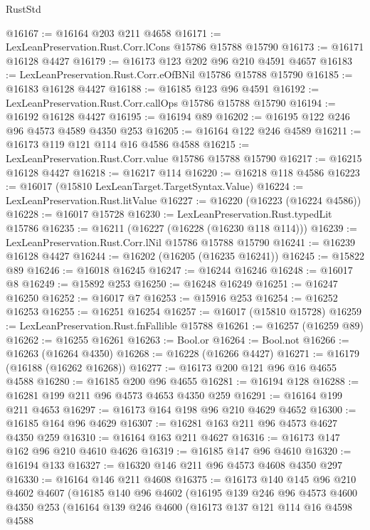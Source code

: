 \begin{lexlean}{RustStd}
\begin{coremodule}
@16167 := @16164 @203 @211 @4658
@16171 := LexLeanPreservation.Rust.Corr.lCons @15786 @15788 @15790
@16173 := @16171 @16128 @4427
@16179 := @16173 @123 @202 @96 @210 @4591 @4657
@16183 := LexLeanPreservation.Rust.Corr.eOfBNil @15786 @15788 @15790
@16185 := @16183 @16128 @4427
@16188 := @16185 @123 @96 @4591
@16192 := LexLeanPreservation.Rust.Corr.callOps @15786 @15788 @15790
@16194 := @16192 @16128 @4427
@16195 := @16194 @89
@16202 := @16195 @122 @246 @96 @4573 @4589 @4350 @253
@16205 := @16164 @122 @246 @4589
@16211 := @16173 @119 @121 @114 @16 @4586 @4588
@16215 := LexLeanPreservation.Rust.Corr.value @15786 @15788 @15790
@16217 := @16215 @16128 @4427
@16218 := @16217 @114
@16220 := @16218 @118 @4586
@16223 := @16017 (@15810 LexLeanTarget.TargetSyntax.Value)
@16224 := LexLeanPreservation.Rust.litValue
@16227 := @16220 (@16223 (@16224 @4586))
@16228 := @16017 @15728
@16230 := LexLeanPreservation.Rust.typedLit @15786
@16235 := @16211 (@16227 (@16228 (@16230 @118 @114)))
@16239 := LexLeanPreservation.Rust.Corr.lNil @15786 @15788 @15790
@16241 := @16239 @16128 @4427
@16244 := @16202 (@16205 (@16235 @16241))
@16245 := @15822 @89
@16246 := @16018 @16245
@16247 := @16244 @16246
@16248 := @16017 @8
@16249 := @15892 @253
@16250 := @16248 @16249
@16251 := @16247 @16250
@16252 := @16017 @7
@16253 := @15916 @253
@16254 := @16252 @16253
@16255 := @16251 @16254
@16257 := @16017 (@15810 @15728)
@16259 := LexLeanPreservation.Rust.fnFallible @15788
@16261 := @16257 (@16259 @89)
@16262 := @16255 @16261
@16263 := Bool.or
@16264 := Bool.not
@16266 := @16263 (@16264 @4350)
@16268 := @16228 (@16266 @4427)
@16271 := @16179 (@16188 (@16262 @16268))
@16277 := @16173 @200 @121 @96 @16 @4655 @4588
@16280 := @16185 @200 @96 @4655
@16281 := @16194 @128
@16288 := @16281 @199 @211 @96 @4573 @4653 @4350 @259
@16291 := @16164 @199 @211 @4653
@16297 := @16173 @164 @198 @96 @210 @4629 @4652
@16300 := @16185 @164 @96 @4629
@16307 := @16281 @163 @211 @96 @4573 @4627 @4350 @259
@16310 := @16164 @163 @211 @4627
@16316 := @16173 @147 @162 @96 @210 @4610 @4626
@16319 := @16185 @147 @96 @4610
@16320 := @16194 @133
@16327 := @16320 @146 @211 @96 @4573 @4608 @4350 @297
@16330 := @16164 @146 @211 @4608
@16375 := @16173
    @140
    @145
    @96
    @210
    @4602
    @4607
    (@16185
      @140
      @96
      @4602
      (@16195
        @139
        @246
        @96
        @4573
        @4600
        @4350
        @253
        (@16164
          @139
          @246
          @4600
          (@16173
            @137
            @121
            @114
            @16
            @4598
            @4588

\end{coremodule}
\end{lexlean}
